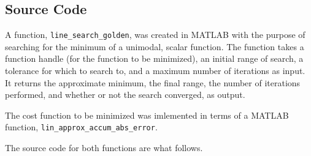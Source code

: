 \documentclass{article}
\begin{document}
\subsection{Source Code}

A function, \texttt{line\_search\_golden}, was created in MATLAB with the purpose of searching for the minimum of a unimodal, scalar function.
The function takes a function handle (for the function to be minimized), an initial range of search, a tolerance for which to search to, and a maximum number of iterations as input.
It returns the approximate minimum, the final range, the number of iterations performed, and whether or not the search converged, as output.

The cost function to be minimized was imlemented in terms of a MATLAB function, \linebreak \texttt{lin\_approx\_accum\_abs\_error}.

The source code for both functions are what follows.
\end{document}
